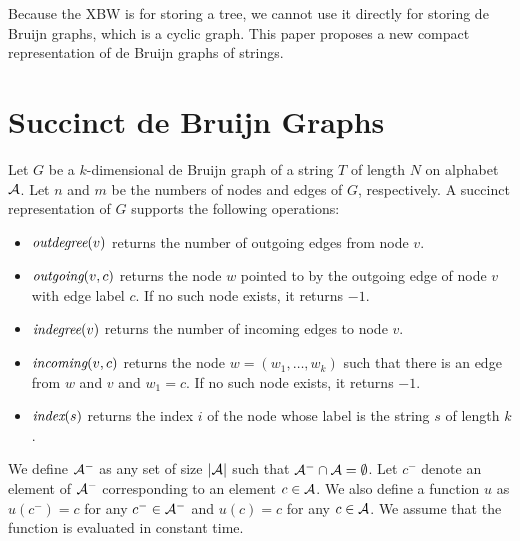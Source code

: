 \documentclass{llncs}
\begin{document}
Because the XBW is for storing a tree, we cannot use it directly for storing de Bruijn graphs,
which is a cyclic graph.
This paper proposes a new compact representation of de Bruijn graphs of strings.



\section{Succinct de Bruijn Graphs}\label{sec:sdg}

Let $G$ be a $k$-dimensional de Bruijn graph of a string $T$ of length $N$ on alphabet ${\cal A}$.
Let $n$ and $m$ be the numbers of nodes and edges of $G$, respectively.
A succinct representation of $G$ supports the following operations:
\begin{itemize}
\item ${\textit{outdegree}}(v)$ returns the number of outgoing edges from node $v$.
\item ${\textit{outgoing}}(v, c)$ returns the node $w$ pointed to by the outgoing edge of node $v$
with edge label $c$.  If no such node exists, it returns $-1$.
\item ${\textit{indegree}}(v)$ returns the number of incoming edges to node $v$.
\item ${\textit{incoming}}(v, c)$ returns the node $w = (w_1,\ldots,w_k)$ such that 
there is an edge from $w$ and $v$
and $w_1 = c$.  If no such node exists, it returns $-1$.
\item ${\textit{index}}(s)$ returns the index $i$ of the node whose label is the string $s$ of length $k$.
\end{itemize}

We define ${\cal A}^-$ as any set of size $|{\cal A}|$ such that ${\cal A}^- \cap {\cal A} = \emptyset$.
Let $c^-$ denote an element of ${\cal A}^-$ corresponding to an element $c \in {\cal A}$.
We also define a function $u$ as $u(c^-) = c$ for any $c^- \in {\cal A}^-$
and $u(c) = c$ for any $c \in {\cal A}$.  We assume that the function is evaluated in constant time.
\end{document}
